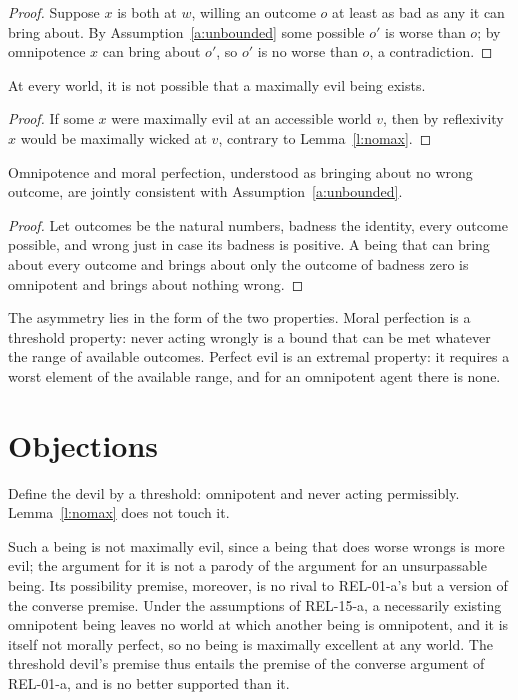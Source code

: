 \documentclass{situationist-preprint}
\begin{document}
\begin{proof}
Suppose $x$ is both at $w$, willing an outcome $o$ at least as bad as any it can bring about. By Assumption~\ref{a:unbounded} some possible $o'$ is worse than $o$; by omnipotence $x$ can bring about $o'$, so $o'$ is no worse than $o$, a contradiction.
\end{proof}

\begin{theorem}\label{t:main}
At every world, it is not possible that a maximally evil being exists.
\end{theorem}

\begin{proof}
If some $x$ were maximally evil at an accessible world $v$, then by reflexivity $x$ would be maximally wicked at $v$, contrary to Lemma~\ref{l:nomax}.
\end{proof}

\begin{proposition}\label{p:asym}
Omnipotence and moral perfection, understood as bringing about no wrong outcome, are jointly consistent with Assumption~\ref{a:unbounded}.
\end{proposition}

\begin{proof}
Let outcomes be the natural numbers, badness the identity, every outcome possible, and wrong just in case its badness is positive. A being that can bring about every outcome and brings about only the outcome of badness zero is omnipotent and brings about nothing wrong.
\end{proof}

The asymmetry lies in the form of the two properties. Moral perfection is a threshold property: never acting wrongly is a bound that can be met whatever the range of available outcomes. Perfect evil is an extremal property: it requires a worst element of the available range, and for an omnipotent agent there is none.

\section{Objections}

\begin{objection}
Define the devil by a threshold: omnipotent and never acting permissibly. Lemma~\ref{l:nomax} does not touch it.
\end{objection}

\begin{reply}
Such a being is not maximally evil, since a being that does worse wrongs is more evil; the argument for it is not a parody of the argument for an unsurpassable being. Its possibility premise, moreover, is no rival to REL-01-a's but a version of the converse premise. Under the assumptions of REL-15-a, a necessarily existing omnipotent being leaves no world at which another being is omnipotent, and it is itself not morally perfect, so no being is maximally excellent at any world. The threshold devil's premise thus entails the premise of the converse argument of REL-01-a, and is no better supported than it.
\end{reply}
\end{document}
